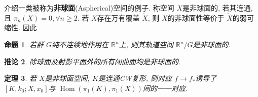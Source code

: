 \documentclass{ctexart}
\theoremstyle{plain}
\newtheorem{theorem}{定理}[section]
\newtheorem{proposition}[theorem]{命题}
\newtheorem{corollary}[theorem]{推论}
\theoremstyle{definition}
\renewcommand{\emph}{\textbf}
\begin{document}
        介绍一类被称为\emph{非球面}(Aspherical)空间的例子. 称空间 $X$是非球面的, 若其连通, 且 $\pi_{n}(X)=0, \forall n\ge 2$. 若 $X$存在万有覆盖 $\tilde{X}$, 则 $X$的非球面性等价于 $\tilde{X}$的弱可缩性. 因此

        \begin{proposition}
            若群 $G$纯不连续地作用在 $\mathbb{R}^{n}$上, 则其轨道空间 $\mathbb{R}^{n}/G$是非球面的.
        \end{proposition}

        \begin{corollary}
            除球面及射影平面外的所有闭曲面均是非球面的.
        \end{corollary}

        \begin{theorem}
            \label{thm:maps in aspherical spaces}
            若 $X$是非球面空间,  $K$是连通CW复形, 则对应 $f\to f_{*}$诱导了 $[K,k_{0};X,x_0]$与 $\operatorname{Hom}(\pi_1(K), \pi_1(X))$间的一一对应.
        \end{theorem}
\end{document}
